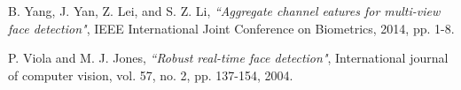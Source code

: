 B. Yang, J. Yan, Z. Lei, and S. Z. Li,
\textit{``Aggregate channel eatures for multi-view face detection"},
IEEE International Joint Conference on Biometrics, 
2014, pp. 1-8.

P. Viola and M. J. Jones,
\textit{``Robust real-time face detection"},
International journal of computer vision,
vol. 57, no. 2, pp. 137-154, 2004.